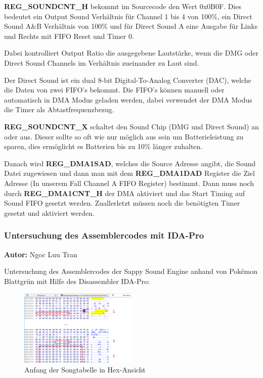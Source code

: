 \documentclass[11pt,a4paper]{scrartcl}
\newcommand{\AutorNgoc} {
    \vspace{-4mm}
    \large \textbf{Autor:} Ngoc Luu Tran \normalsize
    \vspace{2mm}
}
\begin{document}
\textbf{REG\_SOUNDCNT\_H} bekommt im Sourcecode den Wert 0x0B0F. Dies bedeutet ein Output Sound Verh\"altnis f\"ur Channel 1 bis 4 von 100\%, ein Direct Sound A\&B Verh\"altnis von 100\% und f\"ur Direct Sound A eine Ausgabe f\"ur Links und Rechts mit FIFO Reset und Timer 0.

Dabei kontrolliert Output Ratio die ausgegebene Lautst\"arke, wenn die DMG oder Direct Sound Channels im Verh\"altnis zueinander zu Laut sind.

Der Direct Sound ist ein dual 8-bit Digital-To-Analog Converter (DAC), welche die Daten von zwei FIFO's bekommt. Die FIFO's k\"onnen manuell oder automatisch in DMA Modus geladen werden, dabei verwendet der DMA Modus die Timer als Abtastfrequenzbezug.


\textbf{REG\_SOUNDCNT\_X} schaltet den Sound Chip (DMG und Direct Sound) an oder aus. Dieser sollte so oft wie nur m\"oglich aus sein um Batterieleistung zu sparen, dies erm\"oglicht es Batterien bis zu 10\% l\"anger zuhalten. 


Danach wird \textbf{REG\_DMA1SAD}, welches die Source Adresse angibt, die Sound Datei zugewiesen und dann man mit dem \textbf{REG\_DMA1DAD} Register die Ziel Adresse (In unserem Fall Channel A FIFO Register) bestimmt. Dann muss noch durch \textbf{REG\_DMA1CNT\_H} der DMA aktiviert und das Start Timing auf Sound FIFO gesetzt werden. Zuallerletzt m\"ussen noch die ben\"otigten Timer gesetzt und aktiviert werden.


\newpage

\subsubsection{Untersuchung des Assemblercodes mit IDA-Pro} \label{Assemblercode}
\AutorNgoc

Untersuchung des Assemblercodes der Sappy Sound Engine anhand von Pok\'{e}mon Blattgr\"un mit Hilfe des Disassembler IDA-Pro:

\vspace{15pt}

\begin{figure}
	\vspace{-10pt}
	\begin{center}
		\includegraphics[width=0.5\textwidth]{Songtabelle}
	\end{center}
	\vspace{-10pt}
	\caption{Anfang der Songtabelle in Hex-Ansicht}
	\label{fig:hex-view}
	\vspace{-30pt}
\end{figure}
\end{document}
